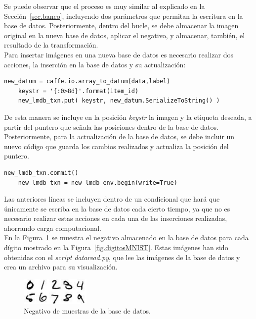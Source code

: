 Se puede observar que el proceso es muy similar al explicado en la Sección~\ref{sec.banco}, incluyendo dos parámetros que permitan la escritura en la base de datos. Posteriormente, dentro del bucle, se debe almacenar la imagen original en la nueva base de datos, aplicar el negativo, y almacenar, también, el resultado de la transformación.\\

Para insertar imágenes en una nueva base de datos es necesario realizar dos acciones, la inserción en la base de datos y su actualización:
\vspace{10pt}
\begin{lstlisting}[frame=single]
	new_datum = caffe.io.array_to_datum(data,label)
	keystr = '{:0>8d}'.format(item_id)
	new_lmdb_txn.put( keystr, new_datum.SerializeToString() )
\end{lstlisting}

De esta manera se incluye en la posición \textit{keystr} la imagen y la etiqueta deseada, a partir del puntero que señala las posiciones dentro de la base de datos. Posteriormente, para la actualización de la base de datos, se debe incluir un nuevo código que guarda los cambios realizados y actualiza la posición del puntero.
\vspace{10pt}
\begin{lstlisting}[frame=single]
	new_lmdb_txn.commit()
	new_lmdb_txn = new_lmdb_env.begin(write=True)
\end{lstlisting}

Las anteriores líneas se incluyen dentro de un condicional que hará que únicamente se escriba en la base de datos cada cierto tiempo, ya que no es necesario realizar estas acciones en cada una de las inserciones realizadas, ahorrando carga computacional.\\

En la Figura~\ref{fig.neg} se muestra el negativo almacenado en la base de datos para cada dígito mostrado en la Figura~\ref{fig.digitosMNIST}. Estas imágenes han sido obtenidas con el \textit{script} \textit{dataread.py}, que lee las imágenes de la base de datos y crea un archivo para su visualización.
\begin{figure}[H]
	\begin{center}
		\includegraphics[width=0.3\textwidth]{figures/negativo}
		\caption{Negativo de muestras de la base de datos.}
		\label{fig.neg}
	\end{center}
\end{figure}

